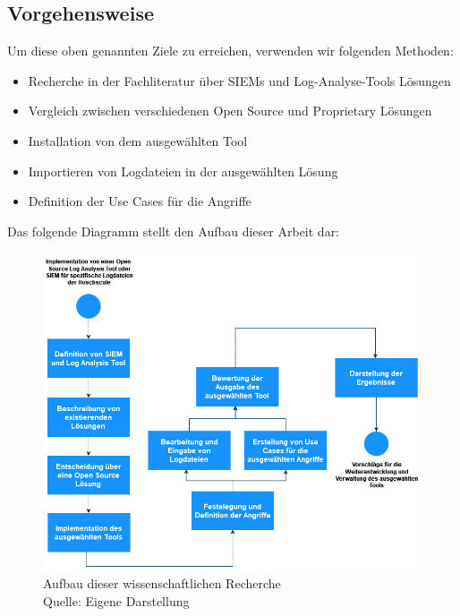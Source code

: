 \newpage
\subsection{Vorgehensweise}
Um diese oben genannten Ziele zu erreichen, verwenden wir folgenden Methoden: 

{
\begin{itemize}[noitemsep]
   \item	Recherche in der Fachliteratur über SIEMs und Log-Analyse-Tools Lösungen 
   \item	Vergleich zwischen verschiedenen Open Source und Proprietary Lösungen 
   \item	Installation von dem ausgewählten Tool 
   \item	Importieren von Logdateien in der ausgewählten Lösung 
   \item	Definition der Use Cases für die Angriffe
\end{itemize}
}

Das folgende Diagramm stellt den Aufbau dieser Arbeit dar:

\begin{figure}[H]
   \centering
   \includegraphics[width=1\textwidth]{assets/1_p1.jpg}
   \caption[Aufbau dieser wissenschaftlichen Recherche]
   {Aufbau dieser wissenschaftlichen Recherche \\Quelle: Eigene Darstellung }
   \centering
\end{figure}



